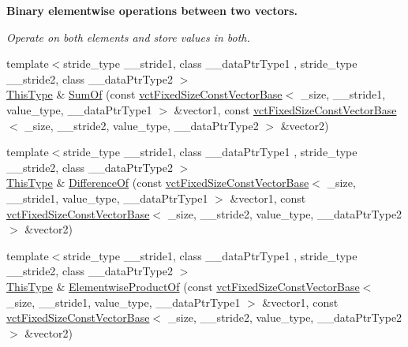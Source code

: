 \begin{Indent}{\bf Binary elementwise operations between two vectors.}\par
{\em Operate on both elements and store values in both. }\begin{DoxyCompactItemize}
\item 
{\footnotesize template$<$stride\+\_\+type \+\_\+\+\_\+stride1, class \+\_\+\+\_\+data\+Ptr\+Type1 , stride\+\_\+type \+\_\+\+\_\+stride2, class \+\_\+\+\_\+data\+Ptr\+Type2 $>$ }\\\hyperlink{classvct_fixed_size_const_vector_base_a071063bc4fa43112cc287b2dbef53180}{This\+Type} \& \hyperlink{classvct_fixed_size_vector_base_af6bd17237d78a517d974eda2646baee3}{Sum\+Of} (const \hyperlink{classvct_fixed_size_const_vector_base}{vct\+Fixed\+Size\+Const\+Vector\+Base}$<$ \+\_\+size, \+\_\+\+\_\+stride1, value\+\_\+type, \+\_\+\+\_\+data\+Ptr\+Type1 $>$ \&vector1, const \hyperlink{classvct_fixed_size_const_vector_base}{vct\+Fixed\+Size\+Const\+Vector\+Base}$<$ \+\_\+size, \+\_\+\+\_\+stride2, value\+\_\+type, \+\_\+\+\_\+data\+Ptr\+Type2 $>$ \&vector2)
\item 
{\footnotesize template$<$stride\+\_\+type \+\_\+\+\_\+stride1, class \+\_\+\+\_\+data\+Ptr\+Type1 , stride\+\_\+type \+\_\+\+\_\+stride2, class \+\_\+\+\_\+data\+Ptr\+Type2 $>$ }\\\hyperlink{classvct_fixed_size_const_vector_base_a071063bc4fa43112cc287b2dbef53180}{This\+Type} \& \hyperlink{classvct_fixed_size_vector_base_a5b4e2b0c1506ba37b12c40a2d98e5290}{Difference\+Of} (const \hyperlink{classvct_fixed_size_const_vector_base}{vct\+Fixed\+Size\+Const\+Vector\+Base}$<$ \+\_\+size, \+\_\+\+\_\+stride1, value\+\_\+type, \+\_\+\+\_\+data\+Ptr\+Type1 $>$ \&vector1, const \hyperlink{classvct_fixed_size_const_vector_base}{vct\+Fixed\+Size\+Const\+Vector\+Base}$<$ \+\_\+size, \+\_\+\+\_\+stride2, value\+\_\+type, \+\_\+\+\_\+data\+Ptr\+Type2 $>$ \&vector2)
\item 
{\footnotesize template$<$stride\+\_\+type \+\_\+\+\_\+stride1, class \+\_\+\+\_\+data\+Ptr\+Type1 , stride\+\_\+type \+\_\+\+\_\+stride2, class \+\_\+\+\_\+data\+Ptr\+Type2 $>$ }\\\hyperlink{classvct_fixed_size_const_vector_base_a071063bc4fa43112cc287b2dbef53180}{This\+Type} \& \hyperlink{classvct_fixed_size_vector_base_a671a77d4cbe2275b2cb0c89496addcb7}{Elementwise\+Product\+Of} (const \hyperlink{classvct_fixed_size_const_vector_base}{vct\+Fixed\+Size\+Const\+Vector\+Base}$<$ \+\_\+size, \+\_\+\+\_\+stride1, value\+\_\+type, \+\_\+\+\_\+data\+Ptr\+Type1 $>$ \&vector1, const \hyperlink{classvct_fixed_size_const_vector_base}{vct\+Fixed\+Size\+Const\+Vector\+Base}$<$ \+\_\+size, \+\_\+\+\_\+stride2, value\+\_\+type, \+\_\+\+\_\+data\+Ptr\+Type2 $>$ \&vector2)

\end{DoxyCompactItemize}
\end{Indent}
